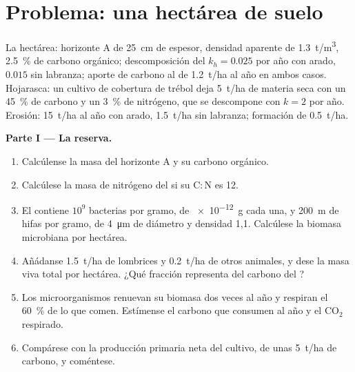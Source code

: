 \section{Problema: una hectárea de suelo}

\begin{problem}
\label{pb:b2:living-soil:1}
La hectárea: horizonte A de \qty{25}{cm} de espesor, densidad aparente de
\qty{1.3}{t/m^3}, \qty{2.5}{\%} de carbono orgánico; descomposición del
 $k_h =
0.025$ por año con arado, $0.015$ sin labranza; aporte de carbono al 
de \qty{1.2}{t/ha} al año en ambos casos. Hojarasca: un cultivo de
cobertura de trébol deja \qty{5}{t/ha} de materia seca con un
\qty{45}{\%} de carbono y un \qty{3}{\%} de nitrógeno, que se descompone
con $k = 2$ por año. Erosión: \qty{15}{t/ha} al año con arado,
\qty{1.5}{t/ha} sin labranza; formación de \qty{0.5}{t/ha}.

\medskip
\noindent\textbf{Parte I --- La reserva.}
\begin{enumerate}
  \item Calcúlense la masa del horizonte A y su carbono orgánico.
  \item Calcúlese la masa de nitrógeno del  si su
        $\mathrm{C:N}$ es 12.
  \item El  contiene $10^{9}$ bacterias por gramo, de \qty{e-12}{g}
        cada una, y \qty{200}{m} de hifas por gramo, de \qty{4}{\micro m}
        de diámetro y densidad 1,1. Calcúlese la biomasa microbiana por
        hectárea.
  \item Añádanse \qty{1.5}{t/ha} de lombrices y \qty{0.2}{t/ha} de otros
        animales, y dese la masa viva total por hectárea. ¿Qué fracción
        representa del carbono del ?
  \item Los microorganismos renuevan su biomasa dos veces al año y
        respiran el \qty{60}{\%} de lo que comen. Estímense el carbono que
        consumen al año y el $\mathrm{CO_2}$ respirado.
  \item Compárese con la producción primaria neta del cultivo, de unas
        \qty{5}{t/ha} de carbono, y coméntese.
\end{enumerate}


\end{problem}

